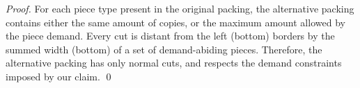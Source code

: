 \documentclass[runningheads]{llncs}
\begin{document}
\begin{proof}
For each piece type present in the original packing, the alternative packing contains either the same amount of copies, or the maximum amount allowed by the piece demand.
Every cut is distant from the left (bottom) borders by the summed width (bottom) of a set of demand-abiding pieces.
Therefore, the alternative packing has only normal cuts, and respects the demand constraints imposed by our claim. \qed





\end{proof}
\end{document}

